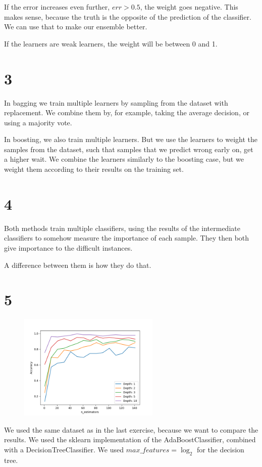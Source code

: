\documentclass[11pt]{article}
\begin{document}
If the error increases even further, $err>0.5$, the weight goes negative. This makes sense, because the truth is the opposite of the prediction of the classifier. We can use that to make our ensemble better.

If the learners are weak learners, the weight will be between 0 and 1.

\section*{3}

In bagging we train multiple learners by sampling from the dataset with replacement. We combine them by, for example, taking the average decision, or using a majority vote.

In boosting, we also train multiple learners. But we use the learners to weight the samples from the dataset, such that samples that we predict wrong early on, get a higher wait. We combine the learners similarly to the boosting case, but we weight them according to their results on the training set.

\section*{4}
Both methods train multiple classifiers, using the results of the intermediate classifiers to somehow measure the importance of each sample. They then both give importance to the difficult instances.

A difference between them is how they do that.

\section*{5}

\begin{figure}[h]
	\centering
	\includegraphics[width=0.6\textwidth]{images/ex2_5_depth_estimators}
	\caption{}
\end{figure}
We used the same dataset as in the last exercise, because we want to compare the results. We used the sklearn implementation of the AdaBoostClassifier, combined with a DecisionTreeClassifier.  We used  $max\_features=\log_2$ for the decision tree.
\end{document}
